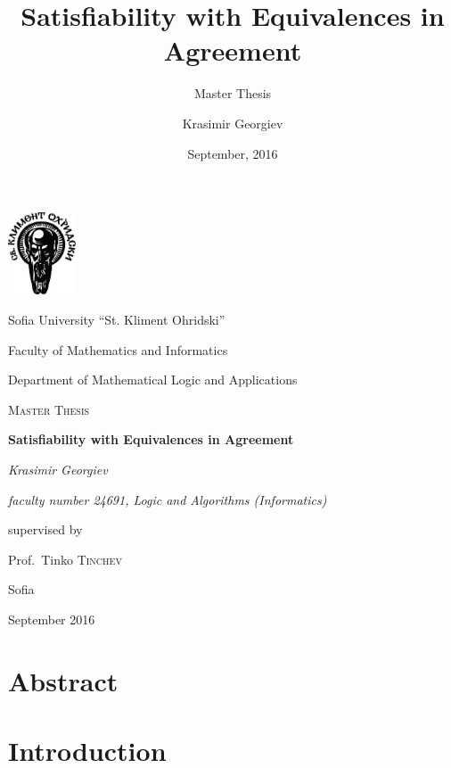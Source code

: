 \documentclass{scrbook}
\begin{document}
\frontmatter
\date{September, 2016}
\title{Satisfiability with Equivalences in Agreement}
\subtitle{Master Thesis}
\author{Krasimir Georgiev} 

\begin{titlepage}
  \centering
  \includegraphics[width=0.15\textwidth]{su_logo_imagelarge.jpg}\par\vspace{1cm}
  {\Large Sofia University ``St. Kliment Ohridski'' \par
  Faculty of Mathematics and Informatics \par
  Department of Mathematical Logic and Applications}
  
  \vspace{1cm}
  {\scshape\LARGE Master Thesis\par}
  \vspace{1.5cm}
  {\huge{\bfseries \textsf{Satisfiability with Equivalences in
  Agreement}\par}}
  \vspace{2cm}
  {\Large\itshape Krasimir Georgiev\par}
  \vspace{0.2cm}
  {\itshape faculty number 24691, Logic and Algorithms (Informatics)}
  \vfill
  {\large supervised by\par
  Prof.~Tinko \textsc{Tinchev}}

  \vfill

  {\large Sofia\par September 2016\par}
\end{titlepage}

\tableofcontents

\printglossary[style=mcolindex]

\chapter{Abstract}


\mainmatter
\chapter{Introduction}\label{ch:intro}











\end{document}
